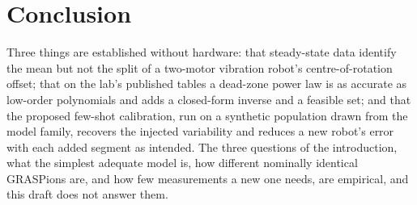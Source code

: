 \section{Conclusion}\label{sec:conclusion}

Three things are established without hardware: that steady-state data
identify the mean but not the split of a two-motor vibration robot's
centre-of-rotation offset; that on the lab's published tables a
dead-zone power law is as accurate as low-order polynomials and adds a
closed-form inverse and a feasible set; and that the proposed few-shot
calibration, run on a synthetic population drawn from the model family,
recovers the injected variability and reduces a new robot's error with
each added segment as intended. The three questions of the introduction, what the simplest
adequate model is, how different nominally identical GRASPions are, and
how few measurements a new one needs, are empirical, and this draft does
not answer them. 
